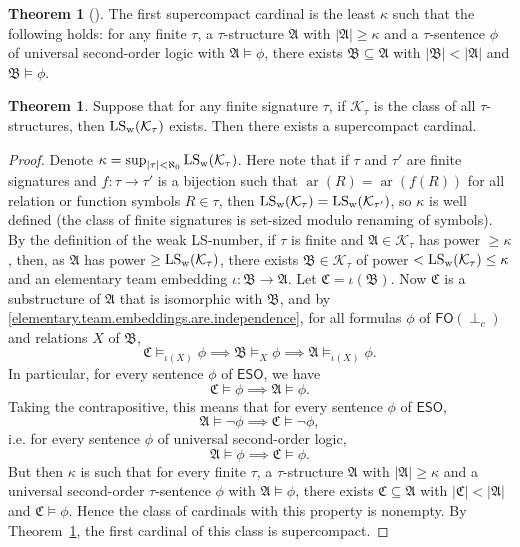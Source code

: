 \documentclass[a4paper]{amsart}
\theoremstyle{definition}
\newtheorem{theorem}[definition]{Theorem}
\theoremstyle{remark}
\newcommand{\A}{\mathcal{A}}
\newcommand{\B}{\mathcal{B}}
\newcommand{\C}{\mathcal{C}}
\newcommand\eso{\mathsf{ESO}}
\newcommand\foil{\mathsf{FO}(\perp_c)}
\newcommand{\K}{\mathcal{K}}
\DeclareMathOperator{\ar}{ar}
\theoremstyle{definition}
\renewcommand{\A}{\mathfrak{A}}
\renewcommand{\B}{\mathfrak{B}}
\renewcommand{\C}{\mathfrak{C}}
\begin{document}
\begin{theorem}[\textcite{MR0295904}]\label{First supercompact vs Pi^1_1}
    The first supercompact cardinal is the least $\kappa$ such that the following holds: for any finite $\tau$, a $\tau$-structure $\A$ with $|\A|\geq\kappa$ and a $\tau$-sentence $\phi$ of universal second-order logic with $\A\models\phi$, there exists $\B\subseteq\A$ with $|\B|<|\A|$ and $\B\models\phi$.
\end{theorem}



\begin{theorem}
    Suppose that for any finite signature $\tau$, if $\K_\tau$ is the class of all $\tau$-structures, then $\WLS(\K_\tau)$ exists. Then there exists a supercompact cardinal.
\end{theorem}
\begin{proof}
    Denote $\kappa = \sup_{|\tau|<\aleph_0}\WLS(\K_\tau)$. Here note that if $\tau$ and $\tau'$ are finite signatures and $f\colon\tau\to\tau'$ is a bijection such that $\ar(R)=\ar(f(R))$ for all relation or function symbols $R\in\tau$, then $\WLS(\K_\tau) = \WLS(\K_{\tau'})$, so $\kappa$ is well defined (the class of finite signatures is set-sized modulo renaming of symbols). By the definition of the weak LS-number, if $\tau$ is finite and $\A\in\K_\tau$ has power $\geq\kappa$, then, as $\A$ has power $\geq\WLS(\K_\tau)$, there exists $\B\in\K_\tau$ of power $<\WLS(\K_\tau)\leq\kappa$ and an elementary team embedding $\iota\colon\B\to\A$. Let $\C = \iota(\B)$. Now $\C$ is a substructure of $\A$ that is isomorphic with $\B$, and by \cref{elementary.team.embeddings.are.independence}, for all formulas $\phi$ of $\foil$ and relations $X$ of $\B$,
    \[
        \C\models_{\iota(X)}\phi \implies \B\models_{X}\phi \implies \A\models_{\iota(X)}\phi.
    \]
    In particular, for every sentence $\phi$ of $\eso$, we have
    \[
        \C\models\phi \implies \A\models\phi.
    \]
    Taking the contrapositive, this means that for every sentence $\phi$ of $\eso$,
    \[
        \A\models\neg\phi \implies \C\models\neg\phi,
    \]
    i.e. for every sentence $\phi$ of universal second-order logic,
    \[
        \A\models\phi \implies \C\models\phi.
    \]
    But then $\kappa$ is such that for every finite $\tau$, a $\tau$-structure $\A$ with $|\A|\geq\kappa$ and a universal second-order $\tau$-sentence $\phi$ with $\A\models\phi$, there exists $\C\subseteq\A$ with $|\C|<|\A|$ and $\C\models\phi$. Hence the class of cardinals with this property is nonempty. By Theorem~\ref{First supercompact vs Pi^1_1}, the first cardinal of this class is supercompact.
\end{proof}
\end{document}
